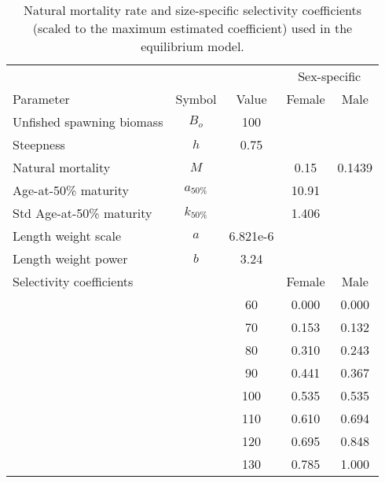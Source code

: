 \begin{table}
	\caption[]{Natural mortality rate and size-specific selectivity coefficients (scaled to the maximum estimated coefficient) used in the equilibrium model.}
	\label{table:Life_history_pars}
	\begin{center}
	\begin{tabular}{lcccc}
		\hline
		 &  & & \multicolumn{2}{c}{Sex-specific}\\
		Parameter         & Symbol     & Value & Female & Male \\
		\hline
		Unfished spawning biomass & $B_o$ & 100 & &\\
		Steepness & $h$ & 0.75 & &\\
		Natural mortality & $M$        &       &   0.15 & 0.1439 \\
		Age-at-50\% maturity & $a_{50\%}$ &      &  10.91 & \\
		Std Age-at-50\% maturity & $k_{50\%}$ &      &  1.406 & \\
		Length weight scale & $a$ & 6.821e-6 & &\\
		Length weight power & $b$ & 3.24 & &\\
		\hline
		
		\multicolumn{3}{l}{Selectivity coefficients}
		 Size (cm) & Female & Male\\
		\hline
		&&  60 & 0.000& 0.000\\
		&&  70 & 0.153& 0.132\\
		&&  80 & 0.310& 0.243\\
		&&  90 & 0.441& 0.367\\
		&& 100 & 0.535& 0.535\\
		&& 110 & 0.610& 0.694\\
		&& 120 & 0.695& 0.848\\
		&& 130 & 0.785& 1.000\\
		\hline
		
	\end{tabular}
	\end{center}
\end{table}



